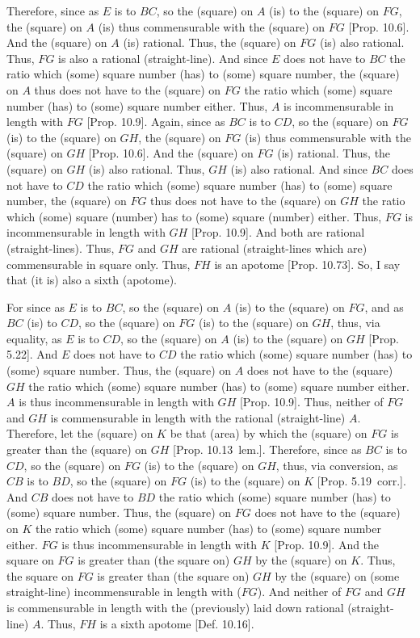 \begin{Parallel}{}{}
{Therefore, since as $E$ is to $BC$, so the (square) on $A$ (is)
to the (square) on $FG$, the (square) on $A$ (is) thus commensurable
with the (square) on $FG$ [Prop. 10.6]. 
And the (square) on $A$ (is) rational. Thus, the (square) on $FG$
(is) also rational. Thus, $FG$  is also a rational (straight-line). And
since $E$ does not have to $BC$ the ratio which (some) square
number (has) to (some) square number, the (square) on $A$
thus does not have to the (square) on $FG$ the ratio which (some)
square number (has) to (some) square number either. Thus,
$A$ is incommensurable in length with $FG$ [Prop. 10.9]. Again, since as $BC$ is to $CD$, so
the (square) on $FG$ (is) to the (square) on $GH$, the (square) on
$FG$ (is) thus commensurable with the (square) on $GH$ [Prop. 10.6]. And the (square) on $FG$ (is) rational.
Thus, the (square) on $GH$ (is) also rational. Thus, $GH$
(is) also rational. And since $BC$ does not have to $CD$ the ratio
which (some) square number (has) to (some) square number, the
(square) on $FG$ thus does not have to the (square) on $GH$
the ratio which (some) square (number) has to (some) square (number)
either. Thus, $FG$ is incommensurable in length with $GH$ [Prop. 10.9]. And both are rational (straight-lines).
Thus, $FG$ and $GH$ are rational (straight-lines which are) commensurable
in square only. Thus, $FH$ is an apotome [Prop. 10.73]. So, I say that (it is) also a sixth (apotome).

For since as $E$ is to $BC$, so the (square) on $A$ (is) to the (square)
on $FG$, and as $BC$ (is) to $CD$, so the (square) on $FG$ (is) to
the (square) on $GH$, thus, via equality, as $E$ is to $CD$, so the
(square) on $A$ (is) to the (square) on $GH$ [Prop. 5.22]. And $E$ does not have to $CD$
the ratio which (some) square number (has) to (some) square number.
Thus, the (square) on $A$ does not have to the (square) $GH$ the
ratio which (some) square number (has) to (some) square number either. $A$ is thus incommensurable in length with $GH$ [Prop. 10.9]. Thus, neither of $FG$ and $GH$
is commensurable in length with the rational (straight-line) $A$. Therefore, let the (square)
on $K$ be that (area) by which the (square) on $FG$ is greater than the (square) on $GH$ [Prop. 10.13~lem.].
 Therefore, since as $BC$ is to $CD$, so the (square) on $FG$ (is) to the
(square) on $GH$, thus, via conversion, as $CB$ is to $BD$, so the (square)
on $FG$ (is) to the (square) on $K$ [Prop. 5.19~corr.]. And $CB$ does not have
to $BD$ the ratio which (some) square number (has) to (some) square
number. Thus, the (square) on $FG$ does not have to the (square) on
$K$ the ratio which (some) square number (has) to (some) square number
either. $FG$ is thus incommensurable in length with $K$ [Prop. 10.9]. And the square on $FG$ is greater
than (the square on) $GH$ by the (square) on $K$.
Thus, the square on
$FG$ is greater than (the square on) $GH$ by the (square)
on (some straight-line) incommensurable in length with ($FG$).
And neither of $FG$ and $GH$ is commensurable in length
with the (previously) laid down rational (straight-line) $A$. Thus,
$FH$ is a sixth apotome [Def. 10.16].

}
\end{Parallel}
